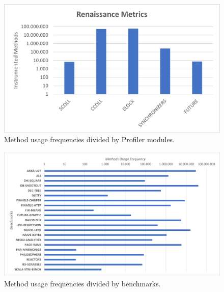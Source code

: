 \documentclass[]{usiinfthesis}
\begin{document}
\begin{figure}
    \centering
    \includegraphics[scale=0.7]{Immagini/final metrics.png} 
    \caption{Method usage frequencies divided by Profiler modules.}
    \label{fig:fig1}
\end{figure}

\begin{figure}
    \centering
    \includegraphics[scale=0.7]{Immagini/finalmetricsbenchm.png} 
    \caption{Method usage frequencies divided by benchmarks.}
    \label{fig:fig1}
\end{figure}

\end{document}
